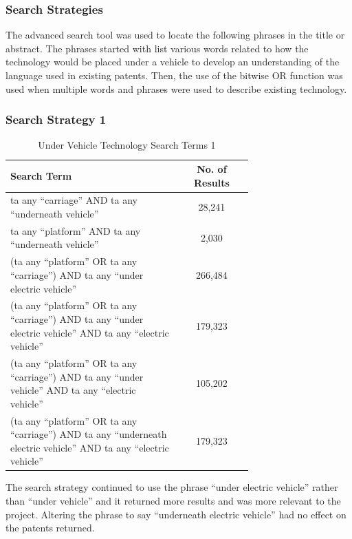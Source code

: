 \documentclass [12pt]{article}
\begin{document}
\subsubsection{Search Strategies}

The advanced search tool was used to locate the following phrases in the title or abstract. The phrases started with list various words related to how the technology would be placed under a vehicle to develop an understanding of the language used in existing patents. Then, the use of the bitwise OR function was used when multiple words and phrases were used to describe existing technology.

\subsubsection{Search Strategy 1}

\begin{table}[H]
    \centering
    \setlength{\arrayrulewidth}{1.5pt}
    \begin{tabular}{|p{0.7\linewidth}|c|}
    \hline
    \cellcolor{gray!40}Search Term & \cellcolor{gray!40}No. of Results \\
    \hline
    ta any “carriage” AND ta any “underneath vehicle” & 28,241 \\
    \hline
    ta any “platform” AND ta any “underneath vehicle” & 2,030 \\
    \hline
    (ta any “platform” OR ta any “carriage”) AND ta any “under electric vehicle” & 266,484 \\
    \hline
    (ta any “platform” OR ta any “carriage”) AND ta any “under electric vehicle” AND ta any “electric vehicle” & 179,323 \\
    \hline
    (ta any “platform” OR ta any “carriage”) AND ta any “under vehicle” AND ta any “electric vehicle” & 105,202 \\
    \hline
    (ta any “platform” OR ta any “carriage”) AND ta any “underneath electric vehicle” AND ta any “electric vehicle” & 179,323 \\
    \hline
    \end{tabular}
    \caption{Under Vehicle Technology Search Terms 1}
    \label{table:under_vehicle__search_strat_1}
\end{table}

The search strategy continued to use the phrase “under electric vehicle” rather than “under vehicle” and it returned more results and was more relevant to the project. Altering the phrase to say “underneath electric vehicle” had no effect on the patents returned.
\end{document}
